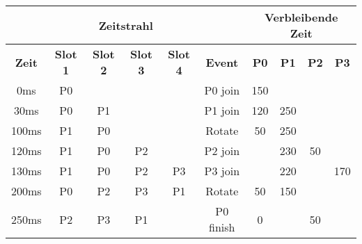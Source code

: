 \begin{frame}
    \begin{table}[]
        \begin{adjustbox}{width=0.8\textwidth}
            \begin{tabular}{c|cccc|c|cccc}
                \multicolumn{6}{c}{\textbf{Zeitstrahl}} & \multicolumn{4}{|c}{\textbf{Verbleibende Zeit}}                                                                                                                                \\ \hline
                \textbf{Zeit}                           & \textbf{Slot 1}                                 & \textbf{Slot 2} & \textbf{Slot 3} & \textbf{Slot 4} & \textbf{Event} & \textbf{P0} & \textbf{P1} & \textbf{P2} & \textbf{P3} \\ \hline
                0ms                                     & \alert{P0}                                      &                 &                 &                 & P0 join        & \alert{150} &             &             &             \\
                \pause 30ms                             & P0                                              & \alert{P1}      &                 &                 & P1 join        & \alert{120} & 250         &             &             \\
                \pause 100ms                            & \alert{P1}                                      & \alert{P0}      &                 &                 & \alert{Rotate} & \alert{50}  & 250         &             &             \\
                \pause 120ms                            & P1                                              & P0              & \alert{P2}      &                 & P2 join        &             & \alert{230} & 50          &             \\
                \pause 130ms                            & P1                                              & P0              & P2              & \alert{P3}      & P3 join        &             & \alert{220} &             & 170         \\
                \pause 200ms                            & \alert{P0}                                      & \alert{P2}      & \alert{P3}      & \alert{P1}      & \alert{Rotate} & 50          & \alert{150} &             &             \\
                \pause 250ms                            & P2                                              & P3              & P1              &                 & P0 finish      & \alert{0}   &             & 50          &             \\

\end{tabular}
\end{adjustbox}
\end{table}
\end{frame}

